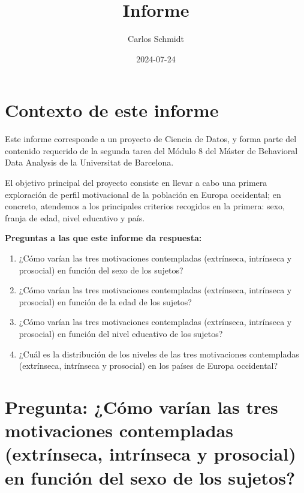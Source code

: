 \documentclass{article}
\title{Informe}
\author{Carlos Schmidt}
\date{2024-07-24}
\begin{document}


\maketitle

\maketitle

\section*{Contexto de este informe}

Este informe corresponde a un proyecto de Ciencia de Datos, y forma parte del contenido requerido de la segunda tarea del Módulo 8 del Máster de Behavioral Data Analysis de la Universitat de Barcelona.

\vspace{1em}

El objetivo principal del proyecto consiste en llevar a cabo una primera exploración de perfil motivacional de la población en Europa occidental; en concreto, atendemos a los principales criterios recogidos en la primera: sexo, franja de edad, nivel educativo y país.

\vspace{1em}

\textbf{Preguntas a las que este informe da respuesta:}
\begin{enumerate}
    \item ¿Cómo varían las tres motivaciones contempladas (extrínseca, intrínseca y prosocial) en función del sexo de los sujetos?
    \item ¿Cómo varían las tres motivaciones contempladas (extrínseca, intrínseca y prosocial) en función de la edad de los sujetos?
    \item ¿Cómo varían las tres motivaciones contempladas (extrínseca, intrínseca y prosocial) en función del nivel educativo de los sujetos?
    \item ¿Cuál es la distribución de los niveles de las tres motivaciones contempladas (extrínseca, intrínseca y prosocial) en los países de Europa occidental?
\end{enumerate}





\section{Pregunta: ¿Cómo varían las tres motivaciones contempladas (extrínseca, intrínseca y prosocial) en función del sexo de los sujetos?
}
\end{document}
